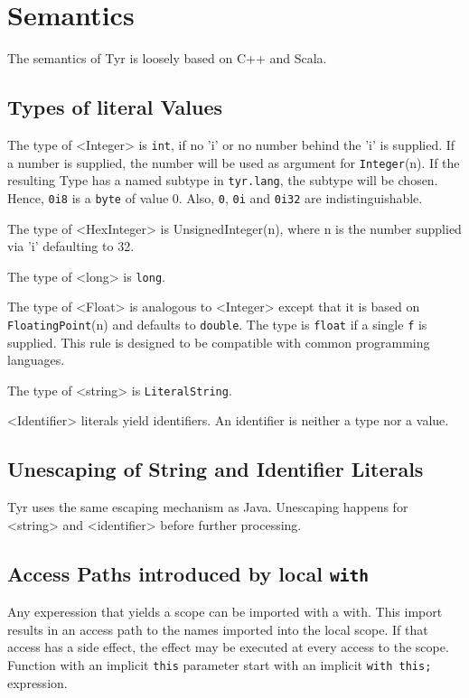 \section{Semantics}

The semantics of Tyr is loosely based on C++ and Scala.

\subsection{Types of literal Values}

The type of <Integer> is \texttt{int}, if no 'i' or no number behind the 'i' is supplied.
If a number is supplied, the number will be used as argument for \texttt{Integer}(n).
If the resulting Type has a named subtype in \texttt{tyr.lang}, the subtype will be chosen.
Hence, \texttt{0i8} is a \texttt{byte} of value 0.
Also, \texttt{0}, \texttt{0i} and \texttt{0i32} are indistinguishable.

The type of <HexInteger> is UnsignedInteger(n), where n is the number supplied via 'i' defaulting to 32.

The type of <long> is \texttt{long}.

The type of <Float> is analogous to <Integer> except that it is based on \texttt{FloatingPoint}(n) and defaults to \texttt{double}.
The type is \texttt{float} if a single \texttt{f} is supplied.
This rule is designed to be compatible with common programming languages.

The type of <string> is \texttt{LiteralString}.

<Identifier> literals yield identifiers.
An identifier is neither a type nor a value.

\subsection{Unescaping of String and Identifier Literals}

Tyr uses the same escaping mechanism as Java.
Unescaping happens for <string> and <identifier> before further processing.


\subsection{Access Paths introduced by local \texttt{with}}

Any experession that yields a scope can be imported with a with.
This import results in an access path to the names imported into the local scope.
If that access has a side effect, the effect may be executed at every access to the scope.
Function with an implicit \texttt{this} parameter start with an implicit \texttt{with this;} expression.


